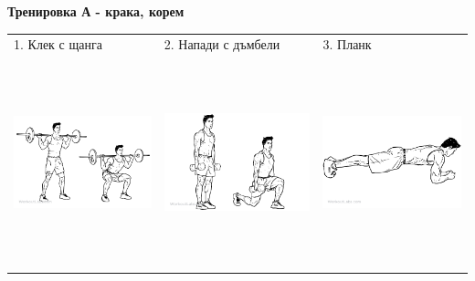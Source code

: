 \documentclass{article}
\begin{document}
\centering
\textbf{Тренировка А - крака, корем}\\
\begin{tabular}{ | m{5cm} | m{5cm} | m{5cm} | }
\hline
1. Клек с щанга & 2. Напади с дъмбели & 3. Планк \\ 
\begin{minipage}{5cm} \includegraphics[width=\linewidth, height=60mm]{Barbell-Squat.png}\end{minipage}&
\begin{minipage}{5cm} \includegraphics[width=\linewidth, height=60mm]{Dumbbell_Lunges.png} \end{minipage}& 
\begin{minipage}{5cm} \includegraphics[width=\linewidth, height=60mm]{front-plank.png} \end{minipage}\\ 

\end{tabular}
\end{document}
